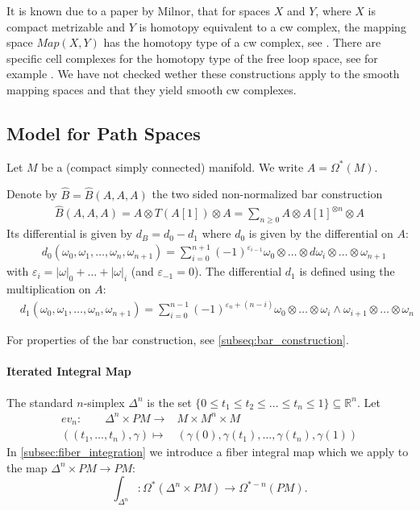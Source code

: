 \documentclass{scrartcl}
\theoremstyle{plain}
\theoremstyle{definition}
\newcommand{\R}{\mathbb R}
\renewcommand{\epsilon}{\varepsilon}
\newcommand{\abs}[1]{\left\lvert#1\right\rvert}
\renewcommand{\subset}{\subseteq}
\begin{document}
It is known due to a paper by Milnor, that for spaces $X$ and $Y$, where $X$ is compact metrizable and $Y$ is homotopy equivalent to a cw complex, the mapping space $Map(X, Y)$ has the homotopy type of a cw complex, see \cite{milnor1959spaces}. There are specific cell complexes for the homotopy type of the free loop space, see for example \cite{rivera2018combinatorial}. We have not checked wether these constructions apply to the smooth mapping spaces and that they yield smooth cw complexes. 




\subsection{Model for Path Spaces}

Let $M$ be a (compact simply connected) manifold. We write $A=\Omega^*(M)$. 

Denote by $\hat B = \hat B(A, A, A)$ the two sided non-normalized bar construction
\begin{align*}
    \hat B(A, A, A) = A\otimes T(A[1]) \otimes A = \sum_{n\geq 0} A\otimes A[1]^{\otimes n} \otimes A
\end{align*}
Its differential is given by $d_B = d_0 - d_1$ where $d_0$ is given by the differential on $A$:
\begin{align*}
    &d_0(\omega_0,\omega_1,\dots,\omega_n,\omega_{n+1}) = \sum_{i=0}^{n+1} (-1)^{\epsilon_{i-1}}\omega_0\otimes\dots\otimes d\omega_i \otimes\dots\otimes\omega_{n+1}
\end{align*}
with $\varepsilon_i = \abs\omega_0+\dots+\abs\omega_i$ (and $\epsilon_{-1} =0$). The differential $d_1$ is defined using the multiplication on $A$:
\begin{align*}
    &d_1(\omega_0,\omega_1,\dots,\omega_n,\omega_{n+1}) = \sum_{i=0}^{n-1}(-1)^{\epsilon_n + (n-i)}\omega_0\otimes \dots\otimes\omega_i\wedge\omega_{i+1}\otimes \dots\otimes \omega_{n}
\end{align*}

For properties of the bar construction, see \ref{subseq:bar_construction}. 

\paragraph{Iterated Integral Map} The standard $n$-simplex $\Delta^n$ is the set $\{0\leq t_1\leq t_2\leq \dots\leq t_n\leq 1\} \subset \R^n$. Let 
\begin{align*}
    ev_n\colon\qquad\Delta^n\times PM \to & M\times M^n\times M \\
    ((t_1,\dots, t_n), \gamma)\mapsto &(\gamma(0), \gamma(t_1), \dots, \gamma(t_n), \gamma(1))
\end{align*}
In \ref{subsec:fiber_integration} we introduce a fiber integral map which we apply to the map $\Delta^n\times PM \to PM$: 
$$\int_{\Delta^n}\colon \Omega^*(\Delta^n\times PM) \to \Omega^{*-n}(PM).$$
\end{document}
